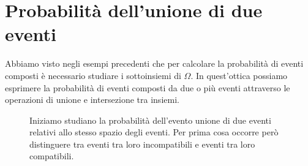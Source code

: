 \section{Probabilità dell'unione di due eventi}
\label{sec:03_unione}

Abbiamo visto negli esempi precedenti che per calcolare la probabilità di 
eventi composti è necessario studiare i sottoinsiemi di $\Omega$. In 
quest'ottica possiamo esprimere la probabilità di eventi composti da due o 
più 
eventi attraverso le operazioni di unione e intersezione tra insiemi.
\begin{inaccessibleblock}
 \begin{figure}[htpb]
\begin{minipage}[c]{.35\textwidth}

\end{minipage}\hfil
\begin{minipage}[c]{.55\textwidth}
Iniziamo studiano la probabilità dell'evento unione di due eventi relativi 
allo 
stesso spazio degli eventi.
Per prima cosa occorre però distinguere tra eventi tra loro incompatibili e 
eventi tra loro compatibili.
\end{minipage}
\end{figure}
\end{inaccessibleblock}




